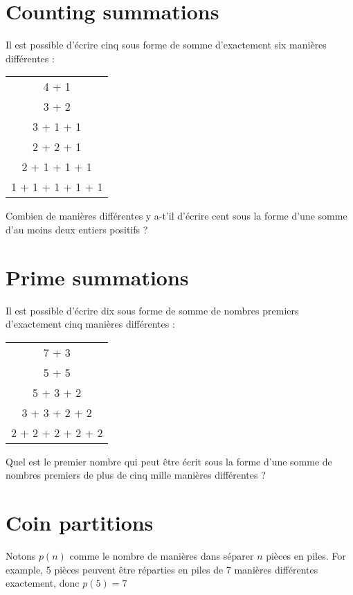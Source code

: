 \section{Counting summations} \label{pb.076}
Il est possible d'écrire cinq sous forme de somme d'exactement six manières différentes :
\begin{center}
    \begin{tabular}{c}
        4 + 1\\
        3 + 2\\
        3 + 1 + 1\\
        2 + 2 + 1\\
        2 + 1 + 1 + 1\\
        1 + 1 + 1 + 1 + 1\\
    \end{tabular}
\end{center}

Combien de manières différentes y a-t'il d'écrire cent sous la forme d'une somme d'au moins deux entiers positifs ?

\section{Prime summations} \label{pb.077}

Il est possible d'écrire dix sous forme de somme de nombres premiers d'exactement cinq manières différentes :

\begin{center}
    \begin{tabular}{c}
        7 + 3\\
        5 + 5\\
        5 + 3 + 2\\
        3 + 3 + 2 + 2\\
        2 + 2 + 2 + 2 + 2\\
    \end{tabular}
\end{center}

Quel est le premier nombre qui peut être écrit sous la forme d'une somme de nombres premiers de plus de cinq mille manières différentes ?

\section{Coin partitions} \label{pb.078}

Notons $p(n)$ comme le nombre de manières dans séparer $n$ pièces en piles. For example, 5 pièces peuvent être réparties en piles de 7 manières différentes exactement, donc $p(5)=7$

